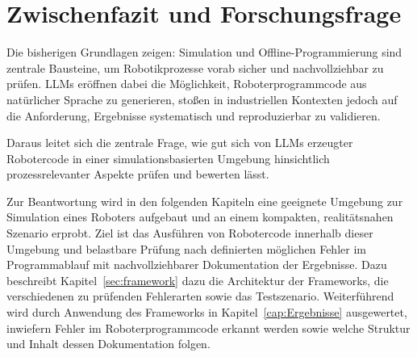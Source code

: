 \section{Zwischenfazit und Forschungsfrage}

Die bisherigen Grundlagen zeigen: Simulation und
Offline-Programmierung sind zentrale Bausteine, um Robotikprozesse
vorab sicher und nachvollziehbar zu prüfen. LLMs eröffnen dabei die
Möglichkeit, Roboterprogrammcode aus natürlicher Sprache zu generieren,
stoßen in industriellen Kontexten jedoch auf die Anforderung,
Ergebnisse systematisch und reproduzierbar zu validieren.

Daraus leitet sich die zentrale Frage, wie gut sich
von LLMs erzeugter Robotercode in einer simulationsbasierten
Umgebung hinsichtlich prozessrelevanter Aspekte
prüfen und bewerten lässt.

Zur Beantwortung wird in den folgenden Kapiteln eine geeignete
Umgebung zur Simulation eines Roboters aufgebaut und an einem
kompakten, realitätsnahen
Szenario erprobt. Ziel ist das Ausführen von Robotercode innerhalb dieser
Umgebung und belastbare Prüfung nach definierten möglichen Fehler im
Programmablauf mit nachvollziehbarer Dokumentation der Ergebnisse.
Dazu beschreibt Kapitel~\ref{sec:framework} dazu die Architektur der Frameworks,
die verschiedenen zu prüfenden Fehlerarten sowie das
Testszenario. Weiterführend wird durch Anwendung des Frameworks in
Kapitel~\ref{cap:Ergebnisse} ausgewertet,
inwiefern Fehler im Roboterprogrammcode
erkannt werden sowie welche
Struktur und Inhalt dessen Dokumentation folgen.
